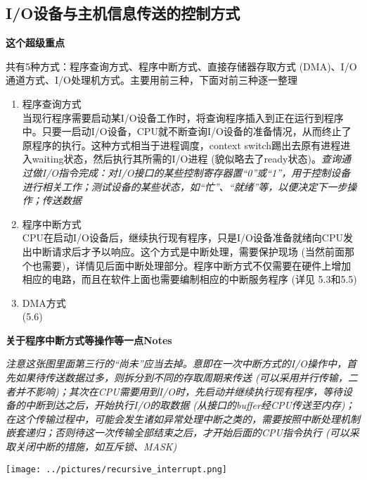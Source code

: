 \documentclass[]{report}
\begin{document}
			\subsection{I/O设备与主机信息传送的控制方式}\par
				\textbf{这个超级重点}\par
				共有5种方式：程序查询方式、程序中断方式、直接存储器存取方式 (DMA)、I/O通道方式、I/O处理机方式。主要用前三种，下面对前三种逐一整理\par
				\begin{enumerate}[label = (\arabic{*})]
					\item 程序查询方式\\当现行程序需要启动某I/O设备工作时，将查询程序插入到正在运行到程序中。只要一启动I/O设备，CPU就不断查询I/O设备的准备情况，从而终止了原程序的执行。这种方式相当于进程调度，context switch踢出去原有进程进入waiting状态，然后执行其所需的I/O进程 (貌似略去了ready状态)。\textit{查询通过做I/O指令完成：对I/O接口的某些控制寄存器置“0”或“1”，用于控制设备进行相关工作；测试设备的某些状态，如“忙”、“就绪”等，以便决定下一步操作；传送数据}
					\item 程序中断方式\\CPU在启动I/O设备后，继续执行现有程序，只是I/O设备准备就绪向CPU发出中断请求后才予以响应。这个方式是中断处理，需要保护现场 (当然前面那个也需要)，详情见后面中断处理部分。程序中断方式不仅需要在硬件上增加相应的电路，而且在软件上面也需要编制相应的中断服务程序 (详见 5.3和5.5)
					\item DMA方式\\ (5.6)
				\end{enumerate}
			\textbf{关于程序中断方式等操作等一点Notes}\par
				{\itshape 注意这张图里面第三行的“尚未”应当去掉。意即在一次中断方式的I/O操作中，首先如果待传送数据过多，则拆分到不同的存取周期来传送 (可以采用并行传输，二者并不影响)；其次在CPU需要用到I/O时，先启动并继续执行现有程序，等待设备的中断到达之后，开始执行I/O的取数据 (从接口的buffer经CPU传送至内存)；在这个传输过程中，可能会发生诸如异常处理中断之类的，需要按照中断处理机制嵌套递归；否则待这一次传输全部结束之后，才开始后面的CPU指令执行 (可以采取关闭中断的措施，如互斥锁、MASK)}\par
				\texttt{[image: ../pictures/recursive\_interrupt.png]}
\end{document}
